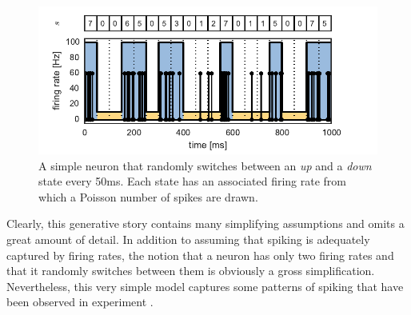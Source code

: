 \begin{figure}[t]
\centering%
\includegraphics[width=5.5in]{figures/ch1/figure1} 
\caption[Simple neuron with two states]{A simple neuron that randomly switches between an \textit{up} and a \textit{down} state every 50ms. Each state has an associated firing rate from which a Poisson number of spikes are drawn.}
\label{fig:updown}
\vspace{-0.5cm}
\end{figure}


Clearly, this generative story contains many simplifying assumptions
and omits a great amount of detail. In addition to assuming that
spiking is adequately captured by firing rates, the notion that a
neuron has only two firing rates and that it randomly switches between
them is obviously a gross simplification. Nevertheless, this very
simple model captures some patterns of spiking that have been observed
in experiment \cite{cowan1994spontaneous, shu2003turning}. 

